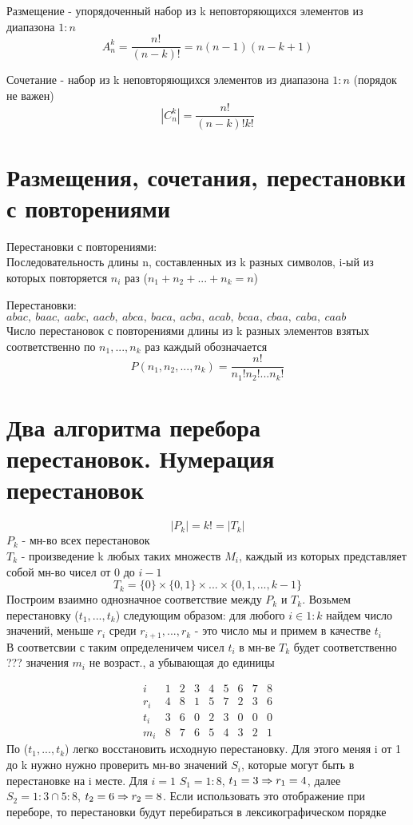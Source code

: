 \documentclass[12pt, fleqn]{article}
\begin{document}
\begin{definition}
  Размещение - упорядоченный набор из k неповторяющихся элементов из диапазона $1:n$
  \[A_n^k = \dfrac{n!}{(n-k)!} = n (n-1)(n-k+1)\]
\end{definition}

\begin{definition}
  Сочетание - набор из k неповторяющихся элементов из диапазона $1:n$ (порядок не важен)
  \[|C_n^k| = \dfrac{n!}{(n-k)! k!}\]
\end{definition}

\section{Размещения, сочетания, перестановки с повторениями}
Перестановки с повторениями:\\
Последовательность длины n, составленных из k разных символов, i-ый из которых повторяется $n_i$ раз ($n_1 + n_2 + ... + n_k = n$)
\begin{example}[aabc]
  Перестановки: $abac,\ baac,\ aabc,\ aacb,\ abca,\ baca,\ acba,\ acab,\ bcaa,\ cbaa,\ caba,\ caab$\\
  Число перестановок с повторениями длины из k разных элементов взятых соответственно по $n_1,...,n_k$ раз каждый обозначается
  \[P(n_1,n_2,...,n_k) = \dfrac{n!}{n_1! n_2! ... n_k!}\]
\end{example}

\section{Два алгоритма перебора перестановок. Нумерация перестановок}
\[|P_k| = k! = |T_k|\]
$P_k$ - мн-во всех перестановок\\
$T_k$ - произведение k любых таких множеств $M_i$, каждый из которых представляет собой мн-во чисел от 0 до $i-1$
\[T_k = \{0\} \times \{0,1\} \times ... \times \{0,1,...,k-1\}\]
Построим взаимно однозначное соответствие между $P_k$ и $T_k$. Возьмем перестановку ($t_1,...,t_k$) следующим образом: для любого $i \in 1:k$ найдем число значений, меньше $r_i$ среди $r_{i+1},...,r_k$ - это число мы и примем в качестве $t_i$\\
В соответсвии с таким определеничем чисел $t_i$ в мн-ве $T_k$ будет соответственно ??? значения $m_i$ не возраст., а убывающая до единицы

\begin{Example}[4,8,1,5,7,2,3,6]
\[\begin{matrix}
  i & 1 & 2 & 3 & 4 & 5 & 6 & 7 & 8\\
  r_i & 4 & 8 & 1 & 5 & 7 & 2 & 3 & 6\\
  t_i & 3 & 6 & 0 & 2 & 3 & 0 & 0 & 0\\
  m_i & 8 & 7 & 6 & 5 & 4 & 3 & 2 & 1
\end{matrix}\]
По ($t_1,...,t_k$) легко восстановить исходную перестановку. Для этого меняя i от 1 до k нужно нужно проверить мн-во значений $S_i$, которые могут быть в перестановке на i месте. Для $i=1$ $S_1 = 1:8$, $t_1 = 3 \Rightarrow r_1 = 4$, далее $S_2 = 1:3 \cap 5:8$, $t_2 = 6 \Rightarrow r_2 = 8$. Если использовать это отображение при переборе, то перестановки будут перебираться в лексикографическом порядке
\end{Example}
\end{document}
